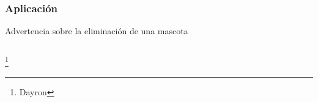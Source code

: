 \documentclass[14pt]{beamer}
\begin{document}
\begin{frame}
\frametitle{Aplicación}
Advertencia sobre la eliminación de una mascota
\begin{columns}
\begin{column}{0.25\textwidth}
\begin{center}


\end{center}
\end{column}

\end{columns}
\footnote{Dayron}
\end{frame}
\end{document}
